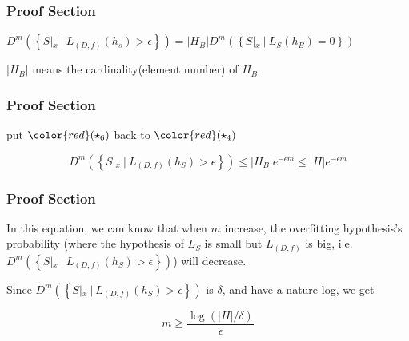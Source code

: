 \documentclass[xcolor=dvipsnames]{beamer}
\theoremstyle{plain}
\newcommand{\sett}[1]{\left\{#1 \right\}}
\begin{document}
\begin{frame}
	\frametitle{Proof Section}
	$D^m(\sett{S|_x ~|~L_{(D,f)}(h_s)>\epsilon}) = |H_B|D^m(\sett{{S|_x ~|~L_S(h_B)=0}})$
	
	$|H_B|$ means the cardinality(element number) of $H_B$
	
\end{frame}


\begin{frame}
	\frametitle{Proof Section}
	put $\color{red}(\star_6)$ back to $\color{red}(\star_4)$ 
	
	$$D^m(\sett{S|_x ~|~ L_{(D,f)}(h_S)>\epsilon}) \leq |H_B|e^{-\epsilon m} \leq |H|e^{-\epsilon m}$$
	
\end{frame}


\begin{frame}
	\frametitle{Proof Section}
	In this equation, we can know that when $m$ increase, the  overfitting hypothesis's probability (where the hypothesis of $L_S$ is small but $L_{(D,f)}$ is big, i.e. $D^m(\sett{S|_x ~|~ L_{(D,f)}(h_S)>\epsilon})$) will decrease.
	
\end{frame}

\begin{frame}
	Since $D^m(\sett{S|_x ~|~ L_{(D,f)}(h_S)>\epsilon})$ is $\delta$, and have a nature log, we get

$$m \geq \dfrac{\log(|H|/\delta)}{\epsilon}$$
\end{frame}

 
\end{document}
